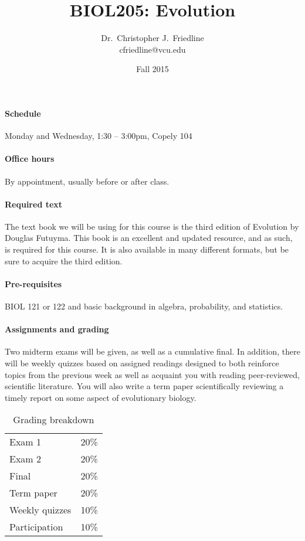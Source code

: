 \documentclass{article}
\title{BIOL205: Evolution}
\author{Dr.\ Christopher J.\ Friedline \\ cfriedline@vcu.edu}
\date{Fall 2015}
\begin{document}
\maketitle
\linespread{1.3}

\paragraph{Schedule}
Monday and Wednesday, 1:30 -- 3:00pm, Copely 104

\paragraph{Office hours}
By appointment, usually before or after class.

\paragraph{Required text}
The text book we will be using for this course is
the third edition of Evolution by Douglas Futuyma. This book is an excellent
and updated resource, and as such, is required for this course. It is also
available in many different formats, but be sure to acquire the third edition.

\paragraph{Pre-requisites}
BIOL 121 or 122 and basic background in algebra, probability, and statistics.

\paragraph{Assignments and grading}
Two midterm exams will be given, as well
as a cumulative final.  In addition, there will be weekly quizzes based on
assigned readings designed to both reinforce topics from the previous week as
well as acquaint you with reading peer-reviewed, scientific literature.  You
will also write a term paper scientifically reviewing a timely report on some
aspect of evolutionary biology.

\begin{table}[h]
\centering
\caption*{Grading breakdown}

\begin{tabular}{l|r}
Exam 1          &   20\% \\
Exam 2          &   20\% \\
Final           &   20\% \\
Term paper      &   20\% \\
Weekly quizzes  &	10\% \\
Participation   &   10\% \\

\end{tabular}

\end{table}
\end{document}
